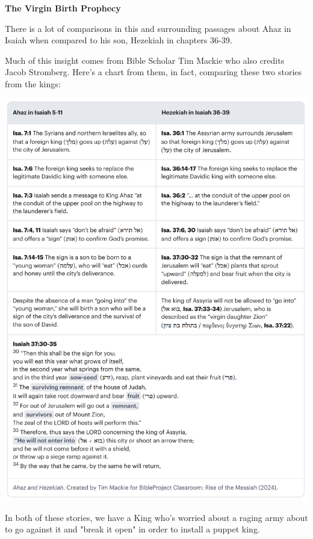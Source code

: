 \documentclass[11pt]{article}
\begin{document}
\vspace{3em}
{\large\bfseries The Virgin Birth Prophecy}
\vspace{1em}

There is a lot of comparisons in this and surrounding passages about Ahaz in Isaiah when compared to his son, Hezekiah in chapters 36-39.

Much of this insight comes from Bible Scholar Tim Mackie who also credits Jacob Stromberg. Here's a chart from them, in fact, comparing these two stories from the kings:

\begin{center}
\includegraphics[width=1\textwidth]{ahaz-hezekiah-comparison.png}
\end{center}
{\vspace{1em}}
In both of these stories, we have a King who's worried about a raging army about to go against it and "break it open" in order to install a puppet king.
\\\\
\end{document}
